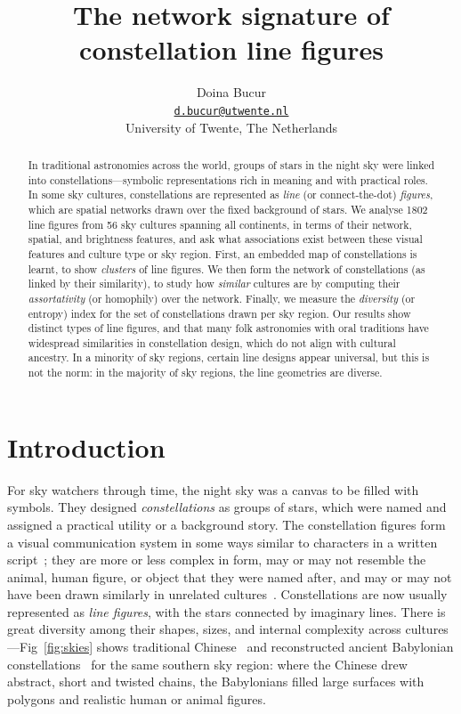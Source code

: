 \documentclass[10pt]{article}
\title{The network signature of constellation line figures}
\date{} %
\author{
	Doina Bucur \orcidlink{0000-0002-4830-7162} \\
	\href{mailto:d.bucur@utwente.nl}{\nolinkurl{d.bucur@utwente.nl}}\\
	University of Twente, The Netherlands
}
\begin{document}
\maketitle

\begin{abstract}
In traditional astronomies across the world, groups of stars in the night sky were linked into constellations---symbolic representations rich in meaning and with practical roles. In some sky cultures, constellations are represented as \emph{line} (or connect-the-dot) \emph{figures}, which are spatial networks drawn over the fixed background of stars. We analyse 1802 line figures from 56 sky cultures spanning all continents, in terms of their network, spatial, and brightness features, and ask what associations exist between these visual features and culture type or sky region. First, an embedded map of constellations is learnt, to show \emph{clusters} of line figures. We then form the network of constellations (as linked by their similarity), to study how \emph{similar} cultures are by computing their \emph{assortativity} (or homophily) over the network. Finally, we measure the \emph{diversity} (or entropy) index for the set of constellations drawn per sky region. Our results show distinct types of line figures, and that many folk astronomies with oral traditions have widespread similarities in constellation design, which do not align with cultural ancestry. In a minority of sky regions, certain line designs appear universal, but this is not the norm: in the majority of sky regions, the line geometries are diverse.
\end{abstract}


\section{Introduction}

For sky watchers through time, the night sky was a canvas to be filled with symbols. They designed \emph{constellations} as groups of stars, which were named and assigned a practical utility or a background story. The constellation figures form a visual communication system in some ways similar to characters in a written script~\cite{miton2021graphic}; they are more or less complex in form, may or may not resemble the animal, human figure, or object that they were named after, and may or may not have been drawn similarly in unrelated cultures~\cite{auerbach03phd}. Constellations are now usually represented as \emph{line figures}, with the stars connected by imaginary lines. There is great diversity among their shapes, sizes, and internal complexity across cultures---Fig~\ref{fig:skies} shows traditional Chinese~\cite{pan1989history,Stellarium} and reconstructed ancient Babylonian constellations~\cite{hoffmann2017hipparchs,hoffmann2017history,hoffmann2018drawing,Stellarium} for the same southern sky region: where the Chinese drew abstract, short and twisted chains, the Babylonians filled large surfaces with polygons and realistic human or animal figures.
\end{document}
